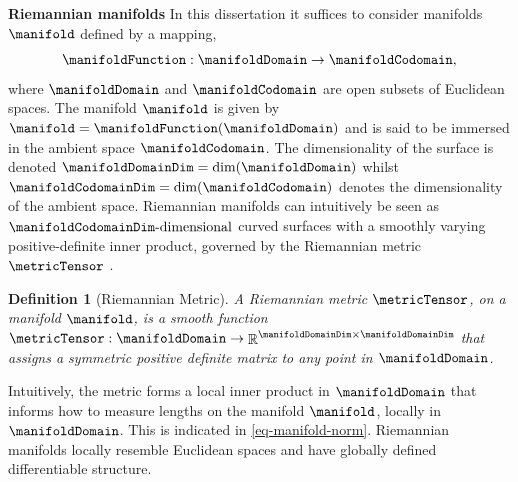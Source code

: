 \documentclass{mimosis-class/mimosis}
\newtheorem{definition}{Definition}[section]
\numberwithin{equation}{chapter}
\DeclareMathOperator{\R}{\mathbb{R}}
\begin{document}
{\newline
\begin{myquote}
\textbf{Riemannian manifolds}
In this dissertation it suffices to consider manifolds $\manifold$ defined by a mapping,
\begin{equation} \label{eq-manifold-function}
\manifoldFunction : \manifoldDomain \rightarrow \manifoldCodomain,
\end{equation}
where $\manifoldDomain$ and $\manifoldCodomain$ are open subsets of Euclidean spaces.
The manifold $\manifold$ is given by $\manifold = \manifoldFunction(\manifoldDomain)$ and is said to
be immersed in the ambient space $\manifoldCodomain$.
The dimensionality of the surface is denoted $\manifoldDomainDim = \text{dim}(\manifoldDomain)$
whilst $\manifoldCodomainDim = \text{dim}(\manifoldCodomain)$ denotes the dimensionality of the ambient space.
Riemannian manifolds can intuitively be seen as $\manifoldCodomainDim\text{-dimensional}$
curved surfaces with a smoothly
varying positive-definite inner product, governed by the Riemannian metric $\metricTensor$ \citep{carmoRiemannian1992}.
\begin{definition}[Riemannian Metric]
A Riemannian metric $\metricTensor$,
on a manifold $\manifold$, is a smooth function
$\metricTensor : \manifoldDomain \rightarrow \R^{\manifoldDomainDim \times \manifoldDomainDim}$
that assigns a symmetric positive definite matrix to any point in $\manifoldDomain$.
\end{definition}
Intuitively, the metric forms a local inner product in $\manifoldDomain$ that informs how to measure lengths
on the manifold $\manifold$, locally in $\manifoldDomain$.
This is indicated in \cref{eq-manifold-norm}.
Riemannian manifolds locally resemble Euclidean spaces and have
globally defined differentiable structure.
\end{myquote}
\newline

}
\end{document}
